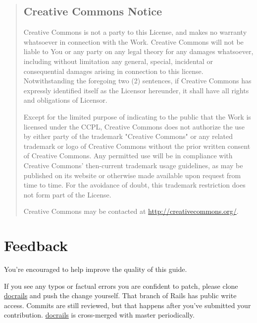 \documentclass[10pt]{book}
\begin{document}
\begin{quotation}

\section{Creative Commons Notice}

Creative Commons is not a party to this License, and           makes no warranty whatsoever in connection with the Work.           Creative Commons will not be liable to You or any party           on any legal theory for any damages whatsoever, including           without limitation any general, special, incidental or           consequential damages arising in connection to this           license. Notwithstanding the foregoing two (2) sentences,           if Creative Commons has expressly identified itself as           the Licensor hereunder, it shall have all rights and           obligations of Licensor.

Except for the limited purpose of indicating to the           public that the Work is licensed under the CCPL, Creative           Commons does not authorize the use by either party of the           trademark "Creative Commons" or any related trademark or           logo of Creative Commons without the prior written           consent of Creative Commons. Any permitted use will be in           compliance with Creative Commons' then-current trademark           usage guidelines, as may be published on its website or           otherwise made available upon request from time to time.           For the avoidance of doubt, this trademark restriction           does not form part of the License.

Creative Commons may be contacted at \href{http://creativecommons.org/}{http://creativecommons.org/}.
\end{quotation}

\chapter{Feedback}

           You're encouraged to help improve the quality of this guide.         

           If you see any typos or factual errors you are confident to           patch, please clone \href{https://github.com/lifo/docrails}{docrails}           and push the change yourself. That branch of Rails has public write access.           Commits are still reviewed, but that happens after you've submitted your           contribution. \href{https://github.com/lifo/docrails}{docrails} is           cross-merged with master periodically.         
\end{document}
